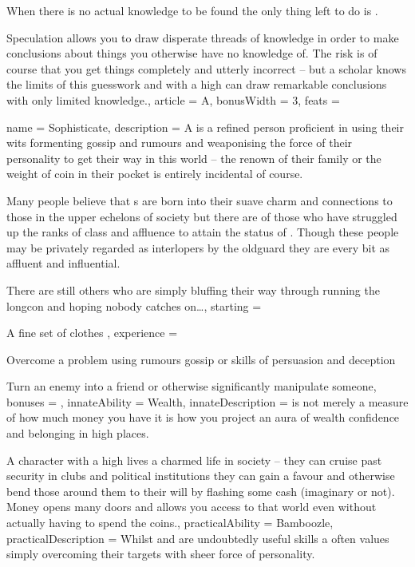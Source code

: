 {When there is no actual knowledge to be found\comma{} the only thing left to do is . 

Speculation allows you to draw disperate threads of knowledge\comma{} in order to make conclusions about things you otherwise have no knowledge of. The risk is\comma{} of course\comma{} that you get things completely and utterly incorrect – but a scholar knows the limits of this guesswork\comma{} and with a high  can draw remarkable conclusions with only limited knowledge.,
	article = A,
	bonusWidth = 3, feats = \ScholarFeats
}

\archetype
{
	name = Sophisticate,
	description = A \bname{} is a refined person\comma{} proficient in using their wits\comma{} formenting gossip and rumours\comma{} and weaponising the force of their personality to get their way in this world – the renown of their family\comma{} or the weight of coin in their pocket is entirely incidental\comma{} of course. 

Many people believe that \name{}s are born into their suave\comma{} charm and connections to those in the upper echelons of society\comma{} but there are of those who have struggled up the ranks of class and affluence to attain the status of \bname{}. Though these people may be privately regarded as interlopers by the old\minus{}guard\comma{} they are every bit as affluent and influential. 

There are still others who are simply bluffing their way through\comma{} running the long\minus{}con and hoping nobody catches on…,
	starting = 
\item A fine set of clothes
,
	experience = \item Overcome a  problem using rumours\comma{} gossip or skills of persuasion and deception
\item Turn an enemy into a friend\comma{} or otherwise significantly manipulate someone,
	bonuses = 
,
	innateAbility = Wealth,
	innateDescription =  is not merely a measure of how much money you have\comma{} it is how you project an aura of wealth\comma{} confidence and belonging in high places. 

A character with a high  lives a charmed life in society – they can cruise past security in clubs and political institutions\comma{} they can gain a favour and otherwise bend those around them to their will by flashing some cash (imaginary or not). Money opens many doors\comma{} and  allows you access to that world\comma{} even without actually having to spend the coins.,
	practicalAbility = Bamboozle,
	practicalDescription = Whilst \comma{}  and  are undoubtedly useful skills\comma{} a \bname{} often values simply overcoming their targets with sheer force of personality. 

}
